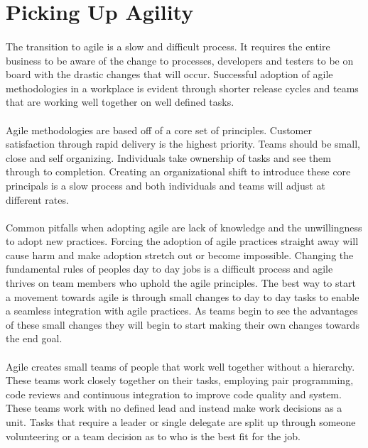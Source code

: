 \documentclass[11pt,twocolumn]{article}
\begin{document}
\section{Picking Up Agility}
\paragraph{}
The transition to agile is a slow and difficult process.
It requires the entire business to be aware of the change to processes, developers and testers to be on board with the drastic changes that will occur.
Successful adoption of agile methodologies in a workplace is evident through shorter release cycles and teams that are working well together on well defined tasks.
\paragraph{}
Agile methodologies are based off of a core set of principles.
Customer satisfaction through rapid delivery is the highest priority.
Teams should be small, close and self organizing.
Individuals take ownership of tasks and see them through to completion.
Creating an organizational shift to introduce these core principals is a slow process and both individuals and teams will adjust at different rates.
\paragraph{}
Common pitfalls when adopting agile are lack of knowledge and the unwillingness to adopt new practices.
Forcing the adoption of agile practices straight away will cause harm and make adoption stretch out or become impossible.
Changing the fundamental rules of peoples day to day jobs is a difficult process and agile thrives on team members who uphold the agile principles.
The best way to start a movement towards agile is through small changes to day to day tasks to enable a seamless integration with agile practices.
As teams begin to see the advantages of these small changes they will begin to start making their own changes towards the end goal.
\paragraph{}
Agile creates small teams of people that work well together without a hierarchy.
These teams work closely together on their tasks, employing pair programming, code reviews and continuous integration to improve code quality and system.
These teams work with no defined lead and instead make work decisions as a unit.
Tasks that require a leader or single delegate are split up through someone volunteering or a team decision as to who is the best fit for the job.
\end{document}
